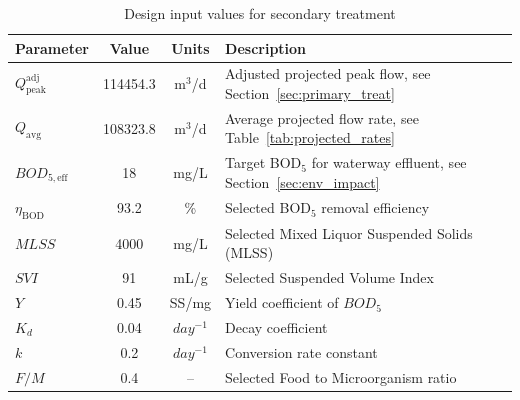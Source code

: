\documentclass[11pt]{article}
\begin{document}
\begin{table}[h]
\centering
\caption{Design input values for secondary treatment}
\label{tab:secondary_inputs}
\begin{tabularx}{\textwidth}{|l|c|c|X|}
\hline
\textbf{Parameter} & \textbf{Value} & \textbf{Units} & \textbf{Description} \\
\hline
$Q_{\text{peak}}^{\text{adj}}$ & 
114454.3
& m$^3$/d & Adjusted projected peak flow, see Section~\ref{sec:primary_treat} \\
$Q_{\text{avg}}$ &
108323.8
& m$^3$/d & Average projected flow rate, see Table~\ref{tab:projected_rates} \\
$BOD_{5,\text{eff}}$ & 
18
& mg/L & Target BOD$_5$ for waterway effluent, see Section~\ref{sec:env_impact}\\
$\eta_{\text{BOD}}$ & 
93.2
& \% & Selected BOD$_5$ removal efficiency\\
$MLSS$ & 
4000
& mg/L & Selected Mixed Liquor Suspended Solids (MLSS) \\
$SVI$ & 
91
& mL/g & Selected Suspended Volume Index \\
$Y$ &
0.45
& SS/mg & Yield coefficient of $BOD_5$\\
$K_d$ &
0.04
& $day^{-1}$ & Decay coefficient\\
$k$ &
0.2
& $day^{-1}$ & Conversion rate constant\\
$F/M$ &
0.4
& -- & Selected Food to Microorganism ratio\\
\hline
\end{tabularx}
\end{table}
\end{document}
